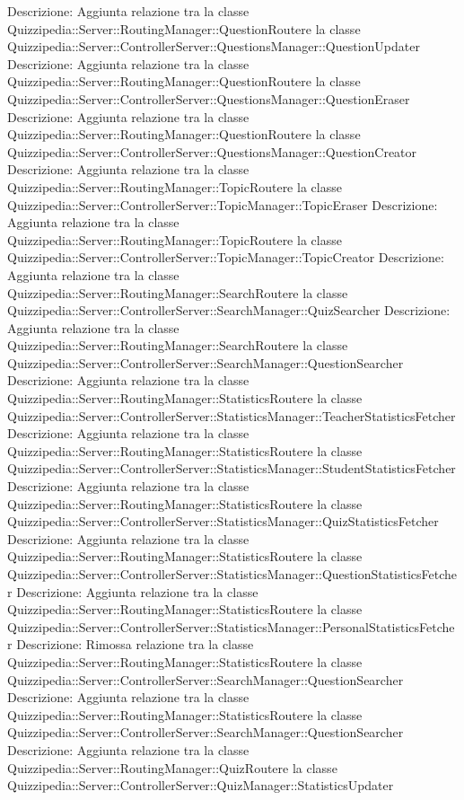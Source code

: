 Descrizione: Aggiunta relazione tra la classe Quizzipedia::Server::RoutingManager::QuestionRoutere la classe Quizzipedia::Server::ControllerServer::QuestionsManager::QuestionUpdater 
Descrizione: Aggiunta relazione tra la classe Quizzipedia::Server::RoutingManager::QuestionRoutere la classe Quizzipedia::Server::ControllerServer::QuestionsManager::QuestionEraser 
Descrizione: Aggiunta relazione tra la classe Quizzipedia::Server::RoutingManager::QuestionRoutere la classe Quizzipedia::Server::ControllerServer::QuestionsManager::QuestionCreator 
Descrizione: Aggiunta relazione tra la classe Quizzipedia::Server::RoutingManager::TopicRoutere la classe Quizzipedia::Server::ControllerServer::TopicManager::TopicEraser 
Descrizione: Aggiunta relazione tra la classe Quizzipedia::Server::RoutingManager::TopicRoutere la classe Quizzipedia::Server::ControllerServer::TopicManager::TopicCreator 
Descrizione: Aggiunta relazione tra la classe Quizzipedia::Server::RoutingManager::SearchRoutere la classe Quizzipedia::Server::ControllerServer::SearchManager::QuizSearcher 
Descrizione: Aggiunta relazione tra la classe Quizzipedia::Server::RoutingManager::SearchRoutere la classe Quizzipedia::Server::ControllerServer::SearchManager::QuestionSearcher 
Descrizione: Aggiunta relazione tra la classe Quizzipedia::Server::RoutingManager::StatisticsRoutere la classe Quizzipedia::Server::ControllerServer::StatisticsManager::TeacherStatisticsFetcher 
Descrizione: Aggiunta relazione tra la classe Quizzipedia::Server::RoutingManager::StatisticsRoutere la classe Quizzipedia::Server::ControllerServer::StatisticsManager::StudentStatisticsFetcher 
Descrizione: Aggiunta relazione tra la classe Quizzipedia::Server::RoutingManager::StatisticsRoutere la classe Quizzipedia::Server::ControllerServer::StatisticsManager::QuizStatisticsFetcher 
Descrizione: Aggiunta relazione tra la classe Quizzipedia::Server::RoutingManager::StatisticsRoutere la classe Quizzipedia::Server::ControllerServer::StatisticsManager::QuestionStatisticsFetcher 
Descrizione: Aggiunta relazione tra la classe Quizzipedia::Server::RoutingManager::StatisticsRoutere la classe Quizzipedia::Server::ControllerServer::StatisticsManager::PersonalStatisticsFetcher 
Descrizione: Rimossa relazione tra la classe Quizzipedia::Server::RoutingManager::StatisticsRoutere la classe Quizzipedia::Server::ControllerServer::SearchManager::QuestionSearcher 
Descrizione: Aggiunta relazione tra la classe Quizzipedia::Server::RoutingManager::StatisticsRoutere la classe Quizzipedia::Server::ControllerServer::SearchManager::QuestionSearcher 
Descrizione: Aggiunta relazione tra la classe Quizzipedia::Server::RoutingManager::QuizRoutere la classe Quizzipedia::Server::ControllerServer::QuizManager::StatisticsUpdater 
